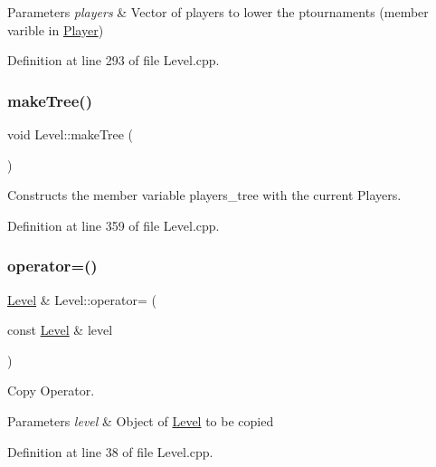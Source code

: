\begin{DoxyParams}{Parameters}
{\em players} & Vector of players to lower the ptournaments (member varible in \hyperlink{class_player}{Player}) \\
\hline
\end{DoxyParams}


Definition at line 293 of file Level.\+cpp.

\hypertarget{class_level_a45217bde102ee160f4852d093f51ed83}{}\label{class_level_a45217bde102ee160f4852d093f51ed83} 
\subsubsection{\texorpdfstring{make\+Tree()}{makeTree()}}
{\footnotesize\ttfamily void Level\+::make\+Tree (\begin{DoxyParamCaption}{ }\end{DoxyParamCaption})}



Constructs the member variable players\+\_\+tree with the current Players. 



Definition at line 359 of file Level.\+cpp.

\hypertarget{class_level_a60eb04b65c900ae8dddf3d6251fac7b1}{}\label{class_level_a60eb04b65c900ae8dddf3d6251fac7b1} 
\subsubsection{\texorpdfstring{operator=()}{operator=()}}
{\footnotesize\ttfamily \hyperlink{class_level}{Level} \& Level\+::operator= (\begin{DoxyParamCaption}\item[{const \hyperlink{class_level}{Level} \&}]{level }\end{DoxyParamCaption})}



Copy Operator. 


\begin{DoxyParams}{Parameters}
{\em level} & Object of \hyperlink{class_level}{Level} to be copied \\
\hline
\end{DoxyParams}


Definition at line 38 of file Level.\+cpp.

\hypertarget{class_level_ac7ecbf06c831f2a02cad567bcfb52ec9}{}\label{class_level_ac7ecbf06c831f2a02cad567bcfb52ec9} 
